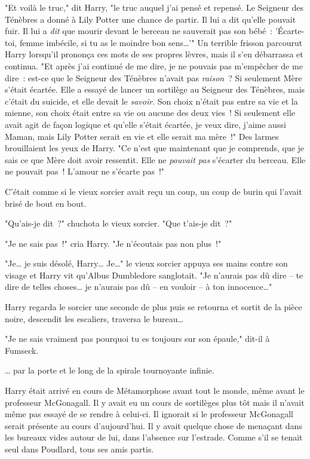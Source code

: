 "Et voilà le truc," dit Harry, "le truc auquel j'ai pensé et repensé. Le Seigneur des Ténèbres a donné à Lily Potter une chance de partir. Il lui a dit qu'elle pouvait fuir. Il lui a \emph{dit} que mourir devant le berceau ne sauverait pas son bébé~: 'Écarte-toi, femme imbécile, si tu as le moindre bon sens…'" Un terrible frisson parcourut Harry lorsqu'il prononça ces mots de ses propres lèvres, mais il s'en débarrassa et continua. "Et après j'ai continué de me dire, je ne pouvais pas m'empêcher de me dire~: est-ce que le Seigneur des Ténèbres n'avait pas \emph{raison}~? Si seulement Mère s'était écartée. Elle a essayé de lancer un sortilège au Seigneur des Ténèbres, mais c'était du suicide, et elle devait le \emph{savoir}. Son choix n'était pas entre sa vie et la mienne, son choix était entre sa vie ou aucune des deux vies~! Si seulement elle avait agit de façon logique et qu'elle s'était écartée, je veux dire, j'aime aussi Maman, mais Lily Potter serait en vie et elle serait ma mère~!" Des larmes brouillaient les yeux de Harry. "Ce n'est que maintenant que je comprends, que je sais ce que Mère doit avoir ressentit. Elle ne \emph{pouvait pas} s'écarter du berceau. Elle ne pouvait pas~! L'amour ne s'écarte pas~!"

C'était comme si le vieux sorcier avait reçu un coup, un coup de burin qui l'avait brisé de bout en bout.

"Qu'ais-je dit~?" chuchota le vieux sorcier. "Que t'ais-je dit~?"

"Je ne sais pas~!" cria Harry. "Je n'écoutais pas non plus~!"

"Je… je suis désolé, Harry… Je…" le vieux sorcier appuya ses mains contre son visage et Harry vit qu'Albus Dumbledore sanglotait. "Je n'aurais pas dû dire -- te dire de telles choses… je n'aurais pas dû -- en vouloir -- à ton innocence…"

Harry regarda le sorcier une seconde de plus puis se retourna et sortit de la pièce noire, descendit les escaliers, traversa le bureau…

"Je ne sais vraiment pas pourquoi tu es toujours sur son épaule," dit-il à Fumseck.

… par la porte et le long de la spirale tournoyante infinie.

\later

Harry était arrivé en cours de Métamorphose avant tout le monde, même avant le professeur McGonagall. Il y avait eu un cours de sortilèges plus tôt mais il n'avait même pas essayé de se rendre à celui-ci. Il ignorait si le professeur McGonagall serait présente au cours d'aujourd'hui. Il y avait quelque chose de menaçant dans les bureaux vides autour de lui, dans l'absence sur l'estrade. Comme s'il se tenait seul dans Poudlard, tous ses amis partis.

